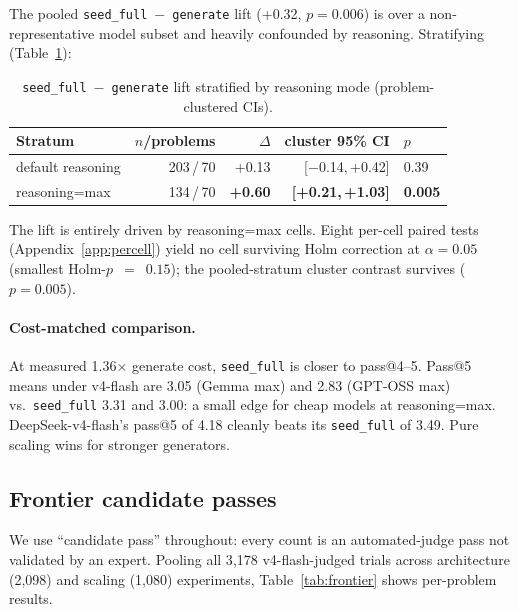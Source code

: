 \documentclass{article}
\begin{document}
The pooled \texttt{seed\_full}~$-$~\texttt{generate} lift (+0.32, $p{=}0.006$) is
over a non-representative model subset and heavily confounded by reasoning.
Stratifying (Table~\ref{tab:seedfull}):

\begin{table}[t]
  \caption{\texttt{seed\_full}~$-$~\texttt{generate} lift stratified by reasoning
    mode (problem-clustered CIs).}
  \label{tab:seedfull}
  \centering
  \small
  \begin{tabular}{lrrrl}
    \toprule
    Stratum & $n$/problems & $\Delta$ & cluster 95\% CI & $p$ \\
    \midrule
    default reasoning & 203\,/\,70 & +0.13 & [$-$0.14,\,+0.42] & 0.39 \\
    reasoning=max & 134\,/\,70 & \textbf{+0.60} & \textbf{[+0.21,\,+1.03]} & \textbf{0.005} \\
    \bottomrule
  \end{tabular}
\end{table}

The lift is entirely driven by reasoning=max cells.
Eight per-cell paired tests (Appendix~\ref{app:percell}) yield no cell surviving
Holm correction at $\alpha{=}0.05$ (smallest Holm-$p$~$=$~$0.15$); the
pooled-stratum cluster contrast survives ($p{=}0.005$).

\paragraph{Cost-matched comparison.}
At measured 1.36$\times$ generate cost, \texttt{seed\_full} is closer to pass@4--5.
Pass@5 means under v4-flash are 3.05 (Gemma max) and 2.83 (GPT-OSS max) vs.\
\texttt{seed\_full} 3.31 and 3.00: a small edge for cheap models at reasoning=max.
DeepSeek-v4-flash's pass@5 of 4.18 cleanly beats its \texttt{seed\_full} of 3.49.
Pure scaling wins for stronger generators.

\subsection{Frontier candidate passes}
\label{sec:frontier}

We use ``candidate pass'' throughout: every count is an automated-judge pass
not validated by an expert.
Pooling all 3{,}178 v4-flash-judged trials across architecture (2{,}098) and
scaling (1{,}080) experiments, Table~\ref{tab:frontier} shows per-problem results.
\end{document}
